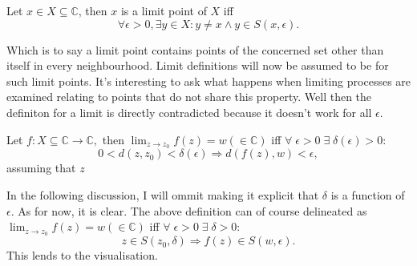 \documentclass[12pt]{book}
\begin{document}
\begin{defn}
    Let $x \in X \subseteq \mathbb{C}$, then $x$ is a limit point of $X$ iff
    $$
        \forall \epsilon > 0, \exists y \in X: y \neq x \land y \in S(x, \epsilon).
    $$
\end{defn}
Which is to say a limit point contains points of the concerned set other than itself in every neighbourhood. Limit definitions will now be assumed to be for such limit points. It's interesting to ask what happens when limiting processes are examined relating to points that do not share this property. Well then the definiton for a limit is directly contradicted because it doesn't work for all $\epsilon.$

\begin{defn}[Limit]
    Let $f: X \subseteq \mathbb{C} \rightarrow \mathbb{C},$ then $\lim_{z \rightarrow z_0} f(z) = w (\in \mathbb{C})$ iff $\forall\; \epsilon > 0\; \exists\; \delta(\epsilon) > 0:$
    $$
        0 < d(z, z_0) < \delta(\epsilon) \Rightarrow d(f(z), w) < \epsilon,
    $$ 
    assuming that $z $
\end{defn}
In the following discussion, I will ommit making it explicit that $\delta$ is a function of $\epsilon.$ As for now, it is clear. The above definition can of course delineated as $\lim_{z \rightarrow z_0} f(z) = w (\in \mathbb{C})$ iff $\forall\; \epsilon > 0\; \exists\; \delta > 0:$
$$
    z \in S(z_0, \delta) \Rightarrow f(z) \in S(w, \epsilon).
$$  
This lends to the visualisation.
\end{document}
